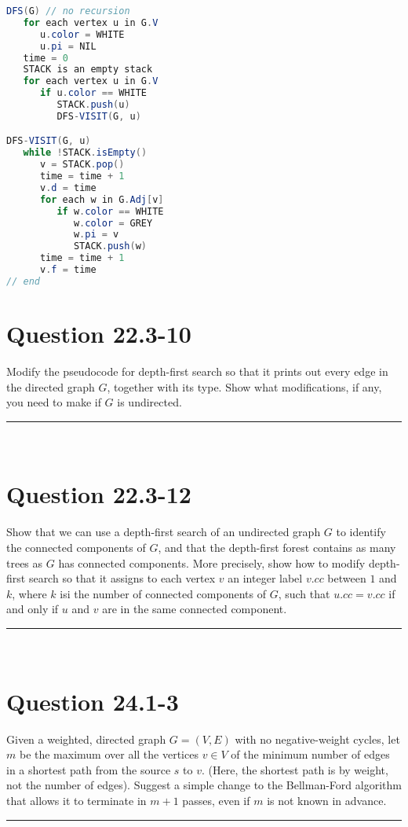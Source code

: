\documentclass[20pt]{article} %
\begin{document}
\begin{lstlisting}[language=java]
DFS(G) // no recursion
   for each vertex u in G.V
      u.color = WHITE
      u.pi = NIL
   time = 0
   STACK is an empty stack
   for each vertex u in G.V
      if u.color == WHITE
         STACK.push(u)
         DFS-VISIT(G, u)

DFS-VISIT(G, u)
   while !STACK.isEmpty()
      v = STACK.pop()
      time = time + 1
      v.d = time
      for each w in G.Adj[v]
         if w.color == WHITE
            w.color = GREY
            w.pi = v
            STACK.push(w)
      time = time + 1
      v.f = time
// end
\end{lstlisting}

\newpage
\section{Question 22.3-10} 
Modify the pseudocode for depth-first search so that it prints out every edge in the directed graph $G$, together with its type. Show what modifications, if any, you need to make if $G$ is undirected. \\
\noindent\rule{2cm}{0.4pt} \\




\section{Question 22.3-12} 
Show that we can use a depth-first search of an undirected graph $G$ to identify the connected components of $G$, and that the depth-first forest contains as many trees as $G$ has connected components.  More precisely, show how to modify depth-first search so that it assigns to each vertex $v$ an integer label $v.cc$ between $1$ and $k$, where $k$ isi the number of connected components of $G$, such that $u.cc = v.cc$ if and only if $u$ and $v$ are in the same connected component. \\
\noindent\rule{2cm}{0.4pt} \\




\section{Question 24.1-3} 
Given a weighted, directed graph $G = (V, E)$ with no negative-weight cycles, let $m$ be the maximum over all the vertices $v \in V$ of the minimum  number of edges in a shortest path from the source $s$ to $v$.  (Here, the shortest path is by weight, not the number of edges). Suggest a simple change to the Bellman-Ford algorithm that allows it to terminate in $m + 1$ passes, even if $m$ is not known in advance. \\
\noindent\rule{2cm}{0.4pt} \\
\end{document}
